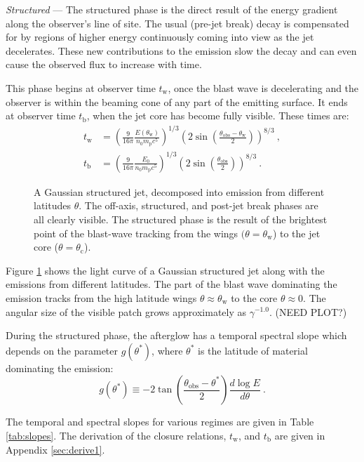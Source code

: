 \documentclass[twocolumn]{aastex62}
\newcommand{\tW}{\ensuremath{t_{\mathrm{w}}}}
\newcommand{\tb}{\ensuremath{t_{\mathrm{b}}}}
\newcommand{\thobs}{\ensuremath{\theta_{\mathrm{obs}}}}
\newcommand{\thW}{\ensuremath{\theta_{\mathrm{w}}}}
\newcommand{\thC}{\ensuremath{\theta_{\mathrm{c}}}}
\newcommand{\Mp}{\ensuremath{m_{\mathrm{p}}}}
\begin{document}
\emph{Structured} --- The structured phase is the direct result of the energy gradient along the observer's line of site.  The usual (pre-jet break) decay is compensated for by regions of higher energy continuously coming into view as the jet decelerates.  These new contributions to the emission slow the decay and can even cause the observed flux to increase with time.

 This phase begins at observer time $\tW$, once the blast wave is decelerating and the observer is within the beaming cone of any part of the emitting surface.  It ends at observer time $\tb$, when the jet core has become fully visible.  These times are:
\begin{align}
	\tW &= \left(\frac{9}{16\pi} \frac{E(\thW)}{n_0 \Mp c^5}\right)^{1/3} \left( 2 \sin \left(\frac{\thobs-\thW}{2}\right)\right)^{8/3} \ ,\label{eq:tw} \\
	\tb &= \left(\frac{9}{16\pi} \frac{E_0}{n_0 \Mp c^5}\right)^{1/3} \left( 2 \sin \left(\frac{\thobs}{2}\right)\right)^{8/3} \ .\label{eq:tb}
\end{align}

\begin{figure}
	\caption{A Gaussian structured jet, decomposed into emission from different latitudes $\theta$.  The off-axis, structured, and post-jet break phases are all clearly visible.  The structured phase is the result of the brightest point of the blast-wave tracking from the wings $(\theta =\thW$) to the jet core ($\theta=\thC$). \label{fig:decomp}}
\end{figure}
Figure \ref{fig:decomp} shows the light curve of a Gaussian structured jet along with the emissions from different latitudes.  The part of the blast wave dominating the emission tracks from the high latitude wings $\theta \approx \thW$ to the core $\theta \approx 0$. The angular size of the visible patch grows approximately as $\gamma^{-1.0}$. (NEED PLOT?)

During the structured phase, the afterglow has a temporal spectral slope which depends on the parameter $g(\theta^*)$, where $\theta^*$ is the latitude of material dominating the emission:
\begin{equation}
	g(\theta^*) \equiv -2 \tan\left(\frac{\thobs - \theta^*}{2}\right)\frac{d \log E}{d \theta}\ . \label{eq:gdef}
\end{equation}

The temporal and spectral slopes for various regimes are given in Table \ref{tab:slopes}.  The derivation of the closure relations, $\tW$, and $\tb$ are given in Appendix \ref{sec:derive1}.
\end{document}

